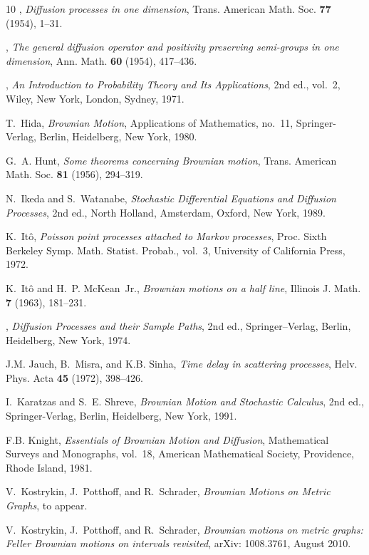 \documentclass[11pt,a4paper]{amsart}
\newcommand{\1}{1}
\theoremstyle{remark}
\numberwithin{equation}{section}
\begin{document}
\begin{thebibliography}{10}
\bysame, \emph{{D}iffusion processes in one dimension}, Trans. American Math.
  Soc. \textbf{77} (1954), 1--31.

\bysame, \emph{{T}he general diffusion operator and positivity preserving
  semi-groups in one dimension}, Ann. Math. \textbf{60} (1954), 417--436.

\bysame, \emph{{A}n {I}ntroduction to {P}robability {T}heory and {I}ts
  {A}pplications}, 2nd ed., vol.~2, Wiley, New York, London, Sydney, 1971.

T.~Hida, \emph{{B}rownian {M}otion}, Applications of Mathematics, no.~11,
  Springer-Verlag, Berlin, Heidelberg, New York, 1980.

G.~A. Hunt, \emph{{S}ome theorems concerning {B}rownian motion}, Trans.
  American Math. Soc. \textbf{81} (1956), 294--319.

N.~Ikeda and S.~Watanabe, \emph{{S}tochastic {D}ifferential {E}quations and
  {D}iffusion {P}rocesses}, 2nd ed., North Holland, Amsterdam, Oxford, New
  York, 1989.

K.~It\^o, \emph{{P}oisson point processes attached to {M}arkov processes},
  Proc. Sixth Berkeley Symp. Math. Statist. Probab., vol.~3, University of
  California Press, 1972.

K.~It\^o and H.~P. McKean~Jr., \emph{{B}rownian motions on a half line},
  Illinois J. Math. \textbf{7} (1963), 181--231.

\bysame, \emph{{D}iffusion {P}rocesses and their {S}ample {P}aths}, 2nd ed.,
  Springer--Verlag, Berlin, Heidelberg, New York, 1974.

J.M. Jauch, B.~Misra, and K.B. Sinha, \emph{{T}ime delay in scattering
  processes}, Helv. Phys. Acta \textbf{45} (1972), 398--426.

I.~Karatzas and S.~E. Shreve, \emph{{B}rownian {M}otion and {S}tochastic
  {C}alculus}, 2nd ed., Springer-Verlag, Berlin, Heidelberg, New York, 1991.

{F.B.} Knight, \emph{{E}ssentials of {B}rownian {M}otion and {D}iffusion},
  Mathematical Surveys and Monographs, vol.~18, American Mathematical Society,
  Providence, Rhode Island, 1981.

V.~Kostrykin, J.~Potthoff, and R.~Schrader, \emph{{B}rownian {M}otions on
  {M}etric {G}raphs}, to appear.

V.~Kostrykin, J.~Potthoff, and R.~Schrader, \emph{{B}rownian motions on metric
  graphs: {F}eller {B}rownian motions on intervals revisited}, arXiv:
  1008.3761, August 2010.


\end{thebibliography}
\end{document}

